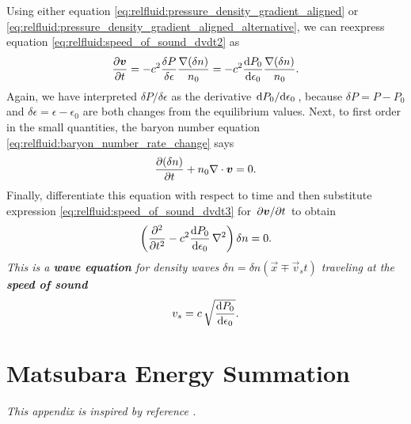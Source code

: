 Using either equation \eqref{eq:relfluid:pressure_density_gradient_aligned} or \eqref{eq:relfluid:pressure_density_gradient_aligned_alternative}, we can reexpress equation \eqref{eq:relfluid:speed_of_sound_dvdt2} as
\begin{equation}
	\pdv{\vec{v}}{t} = -c^2 \frac{\delta P}{\delta \epsilon} \frac{\nabla (\delta n)}{n_0}
	                 = -c^2 \odv{P_0}{\epsilon_0} \frac{\nabla (\delta n)}{n_0} .
\label{eq:relfluid:speed_of_sound_dvdt3}
\end{equation}
Again, we have interpreted $\delta P / \delta \epsilon$ as the derivative $\odv{P_0}/{\epsilon_0}$, because $\delta P = P - P_0$ and $\delta \epsilon = \epsilon - \epsilon_0$ are both changes from the equilibrium values.
Next, to first order in the small quantities, the baryon number equation \eqref{eq:relfluid:baryon_number_rate_change} says
\begin{equation}
	\pdv{(\delta n)}{t} + n_0 \nabla \cdot {\bm{v}} = 0 .
\label{eq:relfluid:speed_of_sound_baryon_number_rate_of_change}
\end{equation}
Finally, differentiate this equation with respect to time and then substitute expression \eqref{eq:relfluid:speed_of_sound_dvdt3} for $\pdv{{\bm{v}}}/{t}$ to obtain
\begin{equation}
	\left( \pdv[2]{}{t} - c^2 \odv{P_0}{\epsilon_0} \, \nabla^2 \right) \delta n = 0 .
\end{equation}
\emph{This is a \textbf{wave equation} for density waves $\delta n = \delta n (\vec{x} \mp \vec{v}_s t)$ traveling at the \textbf{speed of sound}}
\begin{equation}
	v_s = c \, \sqrt{\odv{P_0}{\epsilon_0}} .
\label{eq:relfluid:speed_of_sound}
\end{equation}


\chapter{Matsubara Energy Summation}
\label{chap:matsum}

\textit{This appendix is inspired by reference \cite{ref:altland_simons}.}

